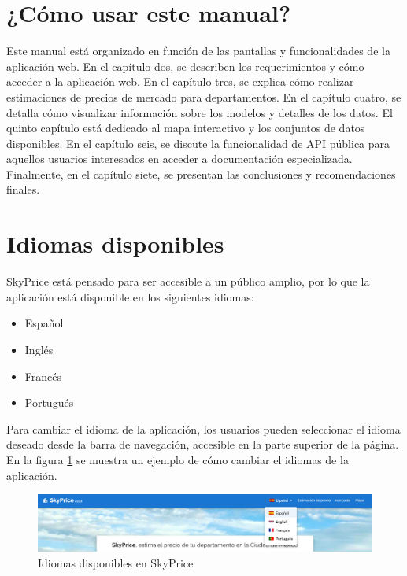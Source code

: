 \section{¿Cómo usar este manual?}
Este manual está organizado en función de las pantallas y funcionalidades de la
aplicación web. En el capítulo dos, se describen los requerimientos y cómo acceder
a la aplicación web. En el capítulo tres, se explica cómo realizar estimaciones de
precios de mercado para departamentos. En el capítulo cuatro, se detalla cómo visualizar
información sobre los modelos y detalles de los datos. El quinto capítulo está
dedicado al mapa interactivo y los conjuntos de datos disponibles. En el capítulo
seis, se discute la funcionalidad de API pública para aquellos usuarios
interesados en acceder a documentación especializada. Finalmente, en el capítulo
siete, se presentan las conclusiones y recomendaciones finales.

\section{Idiomas disponibles}
SkyPrice está pensado para ser accesible a un público amplio, por lo que la aplicación
está disponible en los siguientes idiomas:

\begin{itemize}
  \item Español
  \item Inglés
  \item Francés
  \item Portugués
\end{itemize}

Para cambiar el idioma de la aplicación, los usuarios pueden seleccionar el idioma
deseado desde la barra de navegación, accesible en la parte superior de la página.
En la figura \ref{fig:idiomas-disponibles} se muestra un ejemplo de cómo cambiar el idiomas
de la aplicación.

\begin{figure}[H]
  \centering
  \includegraphics[width=1.0\textwidth]{imagenes/01-introduccion/traducciones.png}
  \caption{Idiomas disponibles en SkyPrice}
  \label{fig:idiomas-disponibles}
\end{figure}

